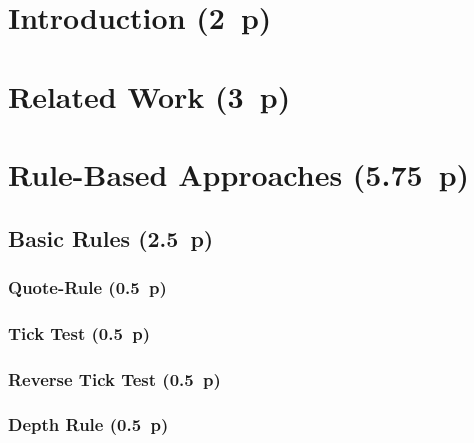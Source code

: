 \section{Introduction (2~p)}\label{introduction}

\section{Related Work (3~p)}\label{related-work}

\section{Rule-Based Approaches (5.75~p)}\label{rule-based-approaches}

\subsection{Basic Rules (2.5~p)}\label{basic-rules}

\subsubsection{Quote-Rule (0.5~p)}\label{quote-rule}

\subsubsection{Tick Test (0.5~p)}\label{tick-test}

\subsubsection{Reverse Tick Test (0.5~p)}\label{reverse-tick-test}

\subsubsection{Depth Rule (0.5~p)}\label{depth-rule}


